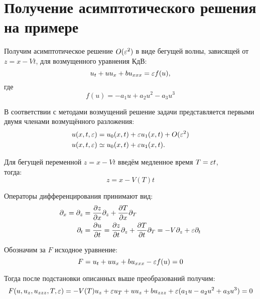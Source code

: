 \chapter*{Получение асимптотического решения на примере}

Получим асимптотическое решение $O(\varepsilon^2)$
в виде бегущей волны,
зависящей от $z=x-Vt$,
для возмущенного уравнения КдВ:
\begin{equation*}
    u_t + u u_x + b u_{xxx} = \varepsilon f(u),
\end{equation*}
где
\begin{equation*}
    f(u) = - a_1 u + a_2 u^2 - a_3 u^3
\end{equation*}

В соответствии с методами возмущений
решение задачи представляется
первыми двумя членами возмущённого разложения:
\begin{align}
    u(x, t, \varepsilon) & = u_0(x, t) + \varepsilon u_1(x, t) +
    O(\varepsilon^2) \nonumber \\
    u(x, t, \varepsilon) & \simeq u_0(x, t) + \varepsilon u_1(x, t). \label{Eq:u}
\end{align}

Для бегущей переменной $z = x - V t$
введём медленное время $T = \varepsilon t$,\\
тогда:
\begin{equation*}
    z = x - V(T) t %
\end{equation*}

Операторы дифференцирования принимают вид:
\begin{align}
    \partial_x = \partial_z & =  
    \pdv{z}{x} \partial_z + \pdv{T}{x} \partial_T \\
    \partial_t & = \pdv{u}{t} =
    \pdv{z}{t} \partial_z + \pdv{T}{t} \partial_T =
    -V \partial_z + \varepsilon \partial_t
\end{align}

Обозначим за $F$ исходное уравнение:
\begin{equation} \label{Eq:F}
    F = u_t + u u_x + b u_{xxx} - \varepsilon f(u) = 0 
\end{equation}

Тогда после подстановки описанных выше преобразований получим:
\begin{equation*}
    F(u, u_z, u_{zzz}, T, \varepsilon) =
    -V(T) u_z + \varepsilon u_T + u u_z + b u_{zzz} +
    \varepsilon (a_1 u - a_2 u^2 + a_3 u^3) = 0
\end{equation*}

